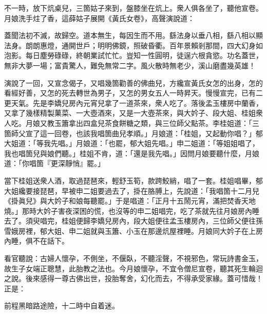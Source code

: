 不一時，放下炕桌兒，三箇姑子來到，盤膝坐在炕上。衆人俱各坐了，聽他宣卷。月娘洗手炷了香，這薛姑子展開《黃氏女卷》，高聲演說道：

\begin{myquote}[\markfont]
蓋聞法初不滅，故歸空。道本無生，每因生而不用。繇法身以垂八相，繇八相以顯法身。朗朗惠燈，通開世戶；明明佛鏡，照破昏衢。百年景賴剎那間，四大幻身如泡影。每日塵勞碌碌，終朝業試忙忙。豈知一性圓明，徒逞六根貪慾。功名蓋世，無非大夢一場；富貴驚人，難免無常二字。風火散時無老少，溪山磨盡幾英雄！
\end{myquote}

演說了一回，又宣念偈子，又唱幾箇勸善的佛曲兒，方纔宣黃氏女怎的出身，怎的看經好善，又怎的死去轉世為男子，又怎的男女五人一時昇天。慢慢宣完，已有二更天氣。先是李嬌兒房內元宵兒拿了一道茶來，衆人吃了。落後孟玉樓房中蘭香，又拿了幾樣精製菓菜、一大壺酒來，又是一大壺茶來，與大妗子、段大姐、桂姐衆人吃。月娘又教玉簫拿出四盒兒茶食餅糖之類，與三位師父點茶。李桂姐道：「三箇師父宣了這一回卷，也該我唱箇曲兒孝順。」月娘道：「桂姐，又起動你唱？」郁大姐道：「等我先唱。」月娘道：「也罷，郁大姐先唱。」申二姐道：「等姐姐唱了，我也唱箇兒與娘們聽。」桂姐不肯，道：「還是我先唱。」因問月娘要聽什麼，月娘道：「你唱箇『更深靜悄』罷。」

當下桂姐送衆人酒，取過琵琶來，輕舒玉筍，款跨鮫綃，唱了一套。桂姐唱畢，郁大姐纔要接琵琶，早被申二姐要過去了，{}掛在胳膊上，先說道：「我唱箇十二月兒《掛眞兒》與大妗子和娘每聽罷。」于是唱道：「正月十五鬧元宵，滿把焚香天地燒。」那時大妗子害夜深困的慌，也沒等的申二姐唱完，吃了茶就先往月娘房內睡去了。須臾唱完，桂姐便歸李嬌兒房內，段大姐便往孟玉樓房內，三位師父便往孫雪娥房裡，郁大姐、申二姐就與玉簫、小玉在那邊炕屋裡睡。月娘同大妗子在上房內睡，俱不在話下。

看官聽說：古婦人懷孕，不側坐，不偃臥，不聽淫聲，不視邪色，常玩詩書金玉，故生子女端正聰慧，此胎教之法也。今月娘懷孕，不宜令僧尼宣卷，聽其死生輪迴之說。後來感得一尊古佛出世，投胎奪舍，幻化而去，不得承受家緣。蓋可惜哉！正是：

\begin{myquote} 
前程黑暗路途險，十二時中自着迷。
\end{myquote} 

